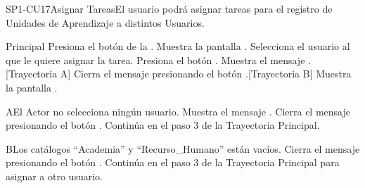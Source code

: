 
\begin{UseCase}{SP1-CU17}{Asignar Tareas}{El usuario podrá asignar tareas para el registro de Unidades de Aprendizaje a distintos Usuarios.}
\end{UseCase}

\begin{UCtrayectoria}{Principal}
    \UCpaso[\UCactor] Presiona el botón \BtnTask de la .
    \UCpaso Muestra la pantalla .
    \UCpaso[\UCactor] Selecciona el usuario al que le quiere asignar la tarea.
    \UCpaso[\UCactor] Presiona el botón .
    \UCpaso Muestra el mensaje .[Trayectoria A]
    \UCpaso[\UCactor] Cierra el mensaje presionando el botón .[Trayectoria B]
    \UCpaso Muestra la pantalla .
\end{UCtrayectoria}


\begin{UCtrayectoriaA}{A}{El Actor no selecciona ningún usuario.}
    \UCpaso Muestra el mensaje .
    \UCpaso[\UCactor] Cierra el mensaje presionando el botón .
    \UCpaso Continúa en el paso 3 de la Trayectoria Principal.
\end{UCtrayectoriaA}

\begin{UCtrayectoriaA}{B}{Los catálogos ``Academia'' y ``Recurso\_Humano'' están vacíos.}
    \UCpaso[\UCactor] Cierra el mensaje presionando el botón .
    \UCpaso Continúa en el paso 3 de la Trayectoria Principal para asignar a otro usuario.
\end{UCtrayectoriaA}